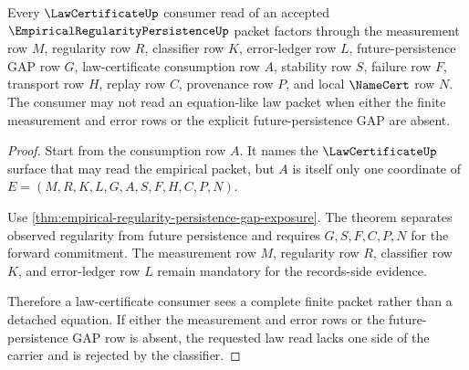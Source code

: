 \begin{theorem}
\label{thm:empirical-regularity-lawcertificate-consumption}
Every $\LawCertificateUp$ consumer read of an accepted $\EmpiricalRegularityPersistenceUp$ packet factors through the measurement row $M$, regularity row $R$, classifier row $K$, error-ledger row $L$, future-persistence GAP row $G$, law-certificate consumption row $A$, stability row $S$, failure row $F$, transport row $H$, replay row $C$, provenance row $P$, and local $\NameCert$ row $N$. The consumer may not read an equation-like law packet when either the finite measurement and error rows or the explicit future-persistence GAP are absent.
\end{theorem}
\begin{proof}
Start from the consumption row $A$. It names the $\LawCertificateUp$ surface that may read the empirical packet, but $A$ is itself only one coordinate of $E=(M,R,K,L,G,A,S,F,H,C,P,N)$.

Use \autoref{thm:empirical-regularity-persistence-gap-exposure}. The theorem separates observed regularity from future persistence and requires $G,S,F,C,P,N$ for the forward commitment. The measurement row $M$, regularity row $R$, classifier row $K$, and error-ledger row $L$ remain mandatory for the records-side evidence.

Therefore a law-certificate consumer sees a complete finite packet rather than a detached equation. If either the measurement and error rows or the future-persistence GAP row is absent, the requested law read lacks one side of the carrier and is rejected by the classifier.
\end{proof}

